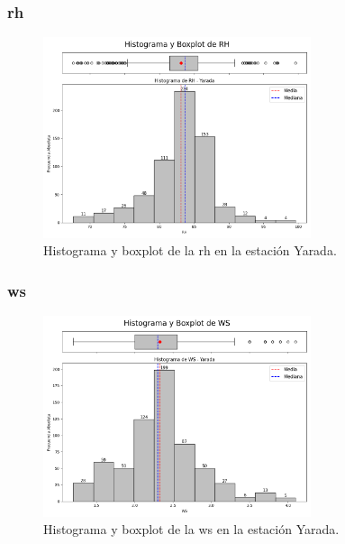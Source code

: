\subsubsection*{\gls{rh} }
\begin{figure}[htbp]
\centering
\includegraphics[width=0.7\textwidth]{resultados/por_estacion_meteorologica/Yarada/RH_histograma.png}
\caption{Histograma y boxplot de la \gls{rh}  en la estación Yarada.}
\label{fig:yarada_RH}
\end{figure}

\subsubsection*{\gls{ws} }
\begin{figure}[htbp]
\centering
\includegraphics[width=0.7\textwidth]{resultados/por_estacion_meteorologica/Yarada/WS_histograma.png}
\caption{Histograma y boxplot de la \gls{ws}  en la estación Yarada.}
\label{fig:yarada_WS}
\end{figure}

